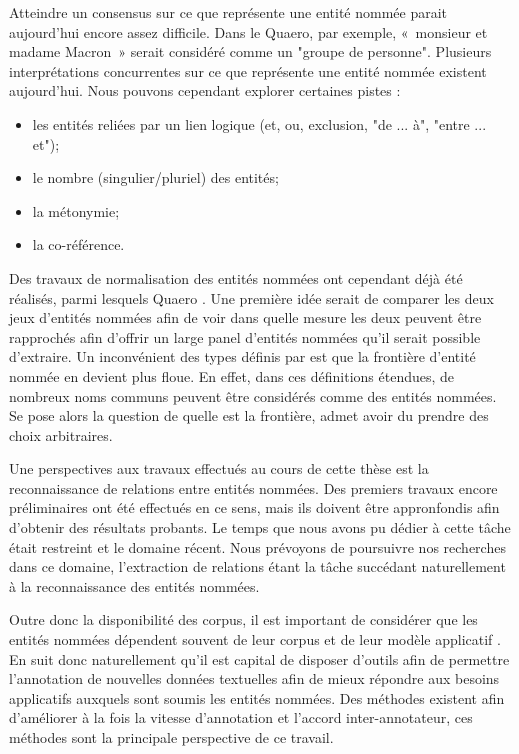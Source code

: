 \documentclass[PhD-Yoann-Dupont.tex]{subfiles}
\begin{document}
Atteindre un consensus sur ce que représente une entité nommée parait aujourd'hui encore assez difficile. Dans le Quaero, par exemple, «\ monsieur et madame Macron\ » serait considéré comme un "groupe de personne". Plusieurs interprétations concurrentes sur ce que représente une entité nommée existent aujourd'hui. Nous pouvons cependant explorer certaines pistes :
\begin{itemize}
    \item les entités reliées par un lien logique (et, ou, exclusion, "de ... à", "entre ... et");
    \item le nombre (singulier/pluriel) des entités;
    \item la métonymie;
    \item la co-référence.
\end{itemize}

Des travaux de normalisation des entités nommées ont cependant déjà été réalisés, parmi lesquels Quaero \citet{sekine2002extended,galibert2011structured}. Une première idée serait de comparer les deux jeux d'entités nommées afin de voir dans quelle mesure les deux peuvent être rapprochés afin d'offrir un large panel d'entités nommées qu'il serait possible d'extraire. Un inconvénient des types définis par \citet{sekine2002extended,galibert2011structured} est que la frontière d'entité nommée en devient plus floue. En effet, dans ces définitions étendues, de nombreux noms communs peuvent être considérés comme des entités nommées. Se pose alors la question de quelle est la frontière, \citet{sekine2002extended} admet avoir du prendre des choix arbitraires.

Une perspectives aux travaux effectués au cours de cette thèse est la reconnaissance de relations entre entités nommées. Des premiers travaux encore préliminaires ont été effectués en ce sens, mais ils doivent être appronfondis afin d'obtenir des résultats probants. Le temps que nous avons pu dédier à cette tâche était restreint et le domaine récent. Nous prévoyons de poursuivre nos recherches dans ce domaine, l'extraction de relations étant la tâche succédant naturellement à la reconnaissance des entités nommées.

Outre donc la disponibilité des corpus, il est important de considérer que les entités nommées dépendent souvent de leur corpus et de leur modèle applicatif \citep{ehrmann2008entites}. En suit donc naturellement qu'il est capital de disposer d'outils afin de permettre l'annotation de nouvelles données textuelles afin de mieux répondre aux besoins applicatifs auxquels sont soumis les entités nommées. Des méthodes existent afin d'améliorer à la fois la vitesse d'annotation et l'accord inter-annotateur, ces méthodes sont la principale perspective de ce travail.
\end{document}
